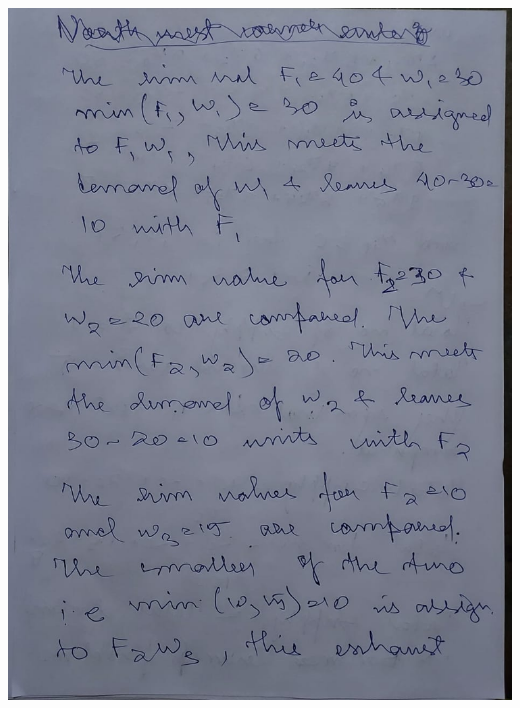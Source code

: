 \documentclass[12pt, letterpaper, twoside]{book}
\begin{document}
\includegraphics[width=\paperwidth, height=\paperheight]{Page5}
\end{document}
